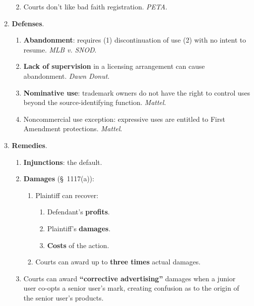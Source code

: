 \begin{enumerate}
\begin{enumerate}
\begin{enumerate}
\begin{enumerate}
                \end{enumerate}
            \end{enumerate}
        \item Courts don't like bad faith registration. \emph{PETA}.
    \end{enumerate}
    \item \textbf{Defenses}.
    \begin{enumerate}
        \item \textbf{Abandonment}: requires (1) discontinuation of use (2) 
        with no intent to resume. \emph{MLB v. SNOD}.
        \item \textbf{Lack of supervision} in a licensing arrangement can 
        cause abandonment. \emph{Dawn Donut}.
        \item \textbf{Nominative use}: trademark owners do not have the right 
        to control uses beyond the source-identifying function. \emph{Mattel}.
        \item Noncommercial use exception: expressive uses are entitled to 
        First Amendment protections. \emph{Mattel}.
    \end{enumerate}
    \item \textbf{Remedies}.
    \begin{enumerate}
        \item \textbf{Injunctions}: the default.
        \item \textbf{Damages} (\S\ 1117(a)):
        \begin{enumerate}
            \item Plaintiff can recover:
            \begin{enumerate}
                \item Defendant's \textbf{profits}.
                \item Plaintiff's \textbf{damages}.
                \item \textbf{Costs} of the action.
            \end{enumerate}
            \item Courts can award up to \textbf{three times} actual damages.
        \end{enumerate}
        \item Courts can award \textbf{``corrective advertising''} damages 
        when a junior user co-opts a senior user's mark, creating confusion as 
        to the origin of the senior user's products.
    \end{enumerate}
\end{enumerate}

